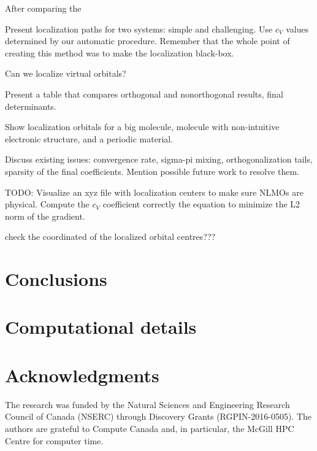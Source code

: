 \documentclass[aps,prl,reprint,amsmath,amssymb]{revtex4-1}
\begin{document}

After comparing the 

Present localization paths for two systems: simple and challenging. Use $c_V$ values determined by our automatic procedure. Remember that the whole point of creating this method was to make the localization black-box.

Can we localize virtual orbitals?

Present a table that compares orthogonal and nonorthogonal results, final determinants.

Show localization orbitals for a big molecule, molecule with non-intuitive electronic structure, and a periodic material.

Discuss existing issues: convergence rate, sigma-pi mixing, orthogonalization tails, sparsity of the final coefficients. Mention possible future work to resolve them.

TODO: Visualize an xyz file with localization centers to make sure NLMOs are physical. Compute the $c_V$ coefficient correctly the equation to minimize the L2 norm of the gradient.

check the coordinated of the localized orbital centres???

\section{Conclusions}


\section{Computational details}


\section{Acknowledgments} 

The research was funded by the Natural Sciences and Engineering Research Council of Canada (NSERC) through Discovery
Grants (RGPIN-2016-0505). The authors are grateful to Compute Canada and, in particular, the McGill HPC Centre for computer time.



\end{document}

